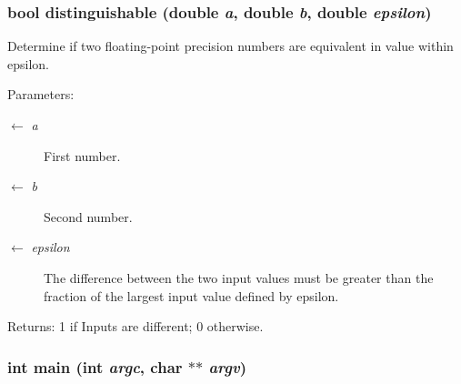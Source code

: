 \subsubsection{\setlength{\rightskip}{0pt plus 5cm}bool distinguishable (double {\em a}, double {\em b}, double {\em epsilon})}\label{meshmorph_8cc_54baf86f92ae2f215fbf2fc9d9913868}


Determine if two floating-point precision numbers are equivalent in value within epsilon. \begin{Desc}
\item[Parameters:]
\begin{description}
\item[\mbox{$\leftarrow$} {\em a}]First number. \item[\mbox{$\leftarrow$} {\em b}]Second number. \item[\mbox{$\leftarrow$} {\em epsilon}]The difference between the two input values must be greater than the fraction of the largest input value defined by epsilon. \end{description}
\end{Desc}
\begin{Desc}
\item[Returns:]1 if Inputs are different; 0 otherwise. \end{Desc}
\subsubsection{\setlength{\rightskip}{0pt plus 5cm}int main (int {\em argc}, char $\ast$$\ast$ {\em argv})}\label{meshmorph_8cc_3c04138a5bfe5d72780bb7e82a18e627}


